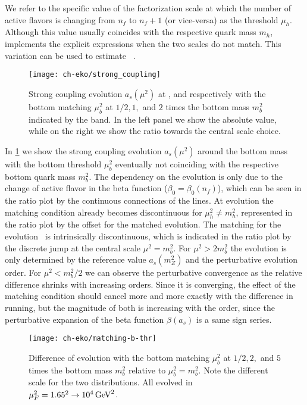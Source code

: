 We refer to the specific value of the factorization scale at which the number
of active flavors is changing from $n_f$ to $n_f+1$ (or vice-versa) as the
threshold $\mu_h$. Although this value usually coincides with the respective
quark mass $m_h$, \eko{} implements the explicit expressions when the two
scales do not match. This variation can be used to estimate \mhou{}~\cite{AbdulKhalek:2019ihb}.

\begin{figure}
    \centering
    \texttt{[image: ch-eko/strong\_coupling]}
    \caption{Strong coupling evolution $a_s(\mu^2)$ at \lo{},
    \nlo{} and \nnlo{}
    respectively with the bottom matching $\mu_b^2$ at $1/2, 1,$ and $2$ times the
    bottom mass $m_b^2$ indicated by the band. In the left panel we show the absolute
    value, while on the right we show the ratio towards the central scale choice.
     \label{fig:eko/asmatching}}
\end{figure}

In \cref{fig:eko/asmatching} we show the strong coupling evolution $a_s(\mu^2)$
around the bottom mass with the bottom threshold $\mu_b^2$ eventually not coinciding
with the respective bottom quark mass $m_b^2$.
The dependency on the \lo{} evolution is only due to the change of active
flavor in the beta function ($\beta_0 = \beta_0(n_f)$), which can be seen in
the ratio plot by the continuous connections of the lines.
At \nlo{} evolution the matching condition already becomes discontinuous for
$\mu_h^2 \neq m_h^2$, represented in the ratio plot by the offset for the
matched evolution. 
The matching for the \nnlo{} evolution~\cite{Chetyrkin:2005ia,Schroder:2005hy}
is intrinsically discontinuous, which is indicated in the ratio plot by the
discrete jump at the central scale $\mu^2 = m_b^2$.
For $\mu^2 > 2m_b^2$ the evolution is only determined by the reference value
$a_s(m_Z^2)$ and the perturbative evolution order.
For $\mu^2 < m_b^2/2$ we can observe the perturbative convergence as the
relative difference shrinks with increasing orders.
Since it is converging, the effect of the matching condition should cancel more
and more exactly with the difference in running, but the magnitude of both is
increasing with the order, since the perturbative expansion of the beta
function $\beta(a_s)$ is a same sign series.

\begin{figure}
    \centering
    \texttt{[image: ch-eko/matching-b-thr]}
    \caption{Difference of \pdf{} evolution with the bottom matching $\mu_b^2$ at $1/2, 2,$ and
        $5$ times the bottom mass $m_b^2$ relative to $\mu_b^2 = m_b^2$. Note
        the different scale for the two distributions.  All evolved in
        $\muF^2=\SI[parse-numbers=false]{1.65^2\to 10^4}{\GeV^2}$.}
    \label{fig:eko/pdfmatching}
\end{figure}

